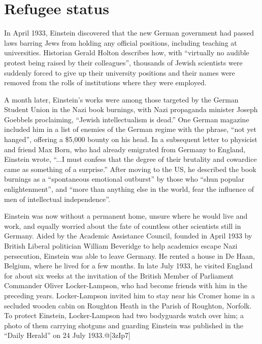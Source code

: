 \documentclass[twoside]{memoir}
\begin{document}
\section{Refugee status}
In April 1933, Einstein discovered that the new German government had passed laws barring Jews from holding any official positions, including teaching at universities. Historian Gerald Holton describes how, with \enquote{virtually no audible protest being raised by their colleagues}, thousands of Jewish scientists were suddenly forced to give up their university positions and their names were removed from the rolls of institutions where they were employed.

A month later, Einstein's works were among those targeted by the German Student Union in the Nazi book burnings, with Nazi propaganda minister Joseph Goebbels proclaiming, \enquote{Jewish intellectualism is dead.} One German magazine included him in a list of enemies of the German regime with the phrase, \enquote{not yet hanged}, offering a \$5,000 bounty on his head. In a subsequent letter to physicist and friend Max Born, who had already emigrated from Germany to England, Einstein wrote, \enquote{...I must confess that the degree of their brutality and cowardice came as something of a surprise.} After moving to the US, he described the book burnings as a \enquote{spontaneous emotional outburst} by those who \enquote{shun popular enlightenment}, and \enquote{more than anything else in the world, fear the influence of men of intellectual independence}.

Einstein was now without a permanent home, unsure where he would live and work, and equally worried about the fate of countless other scientists still in Germany. Aided by the Academic Assistance Council, founded in April 1933 by British Liberal politician William Beveridge to help academics escape Nazi persecution, Einstein was able to leave Germany. He rented a house in De Haan, Belgium, where he lived for a few months. In late July 1933, he visited England for about six weeks at the invitation of the British Member of Parliament Commander Oliver Locker-Lampson, who had become friends with him in the preceding years. Locker-Lampson invited him to stay near his Cromer home in a secluded wooden cabin on Roughton Heath in the Parish of Roughton, Norfolk. To protect Einstein, Locker-Lampson had two bodyguards watch over him; a photo of them carrying shotguns and guarding Einstein was published in the \enquote{Daily Herald} on 24 July 1933.@[3zIp7]
\end{document}

